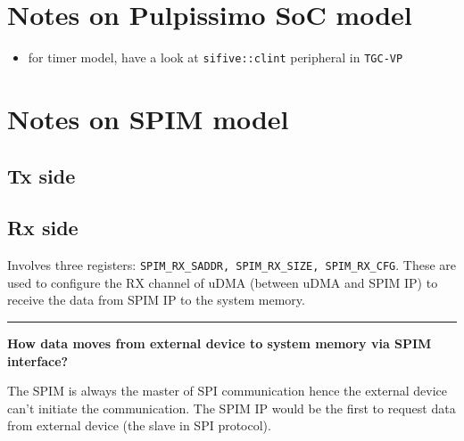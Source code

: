 \documentclass{article}
\begin{document}
\section{Notes on Pulpissimo SoC model}
\begin{itemize}
 \item for timer model, have a look at \texttt{sifive::clint} peripheral in \texttt{TGC-VP}
\end{itemize}

\section{Notes on SPIM model}
\subsection{Tx side}

\subsection{Rx side}
Involves three registers: \texttt{SPIM\_RX\_SADDR, SPIM\_RX\_SIZE, SPIM\_RX\_CFG}. These are used to configure the RX
channel of uDMA (between uDMA and SPIM IP) to receive the data from SPIM IP to the system memory.

\noindent \rule[0.5ex]{\linewidth}{1pt}

\noindent \textbf{How data moves from external device to system memory via SPIM interface?}

The SPIM is always the master of SPI communication hence the external device can't initiate the communication. The
SPIM IP would be the first to request data from external device (the slave in SPI protocol).
\end{document}
